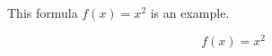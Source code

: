 \documentclass{article}
\begin{document}
This formula $f(x) = x^2$ is an example.

\begin{equation*}
  f(x) = x^2
\end{equation*}
\end{document}
